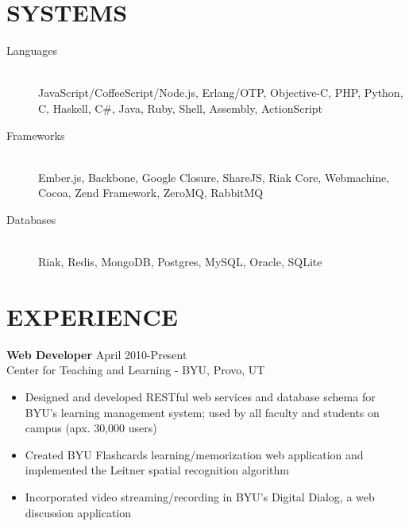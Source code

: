 \documentclass[margin]{res}
\begin{document}
 


  \address{\bf  377 N 750 E\\Provo, UT 84606\\(801) 803-8577}
  \address{bytheway.cameron@gmail.com\\LinkedIn: Cameron Bytheway\\
           Github: http://github.com/CamShaft}

  \begin{resume}

    \section{SYSTEMS}
      \begin{description}
        \item[Languages] \hfill \\
        JavaScript/CoffeeScript/Node.js, Erlang/OTP, Objective-C, PHP, Python, 
        C, Haskell, C\#, Java, Ruby, Shell, Assembly, ActionScript
        \item[Frameworks] \hfill \\
        Ember.js, Backbone, Google Closure, ShareJS, Riak Core, Webmachine, 
        Cocoa, Zend Framework, ZeroMQ, RabbitMQ
        \item[Databases] \hfill \\
        Riak, Redis, MongoDB, Postgres, MySQL, Oracle, SQLite
      \end{description}

    \section{EXPERIENCE}
      {\bf Web Developer} \hfill April 2010-Present \\
      Center for Teaching and Learning - BYU, Provo, UT
      \begin{itemize} \itemsep -2pt
        \item Designed and developed RESTful web services and database
         schema for BYU's learning management system; used by all 
         faculty and students on campus (apx. 30,000 users)
        \item Created BYU Flashcards learning/memorization web 
        application and implemented the Leitner spatial recognition 
        algorithm
        \item Incorporated video streaming/recording in BYU's Digital 
        Dialog, a web discussion application
      \end{itemize}


\end{resume}
\end{document}
